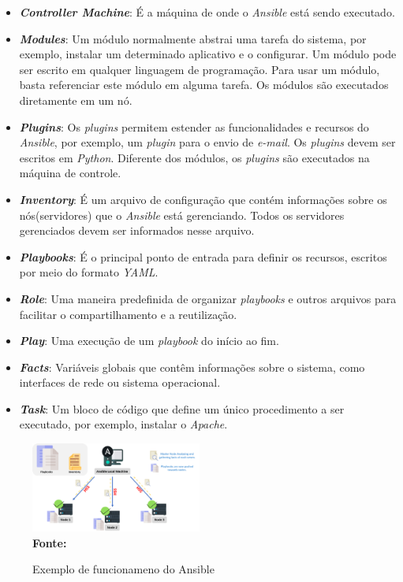 \hfill
 \begin{itemize}
\item \textbf{\textit{Controller Machine}}: É a máquina de onde o \textit{Ansible} está sendo executado. 

\item \textbf{\textit{Modules}}: Um módulo normalmente abstrai uma tarefa do sistema, por exemplo, instalar um determinado aplicativo e o configurar. Um módulo pode ser escrito em qualquer linguagem de programação. Para usar um módulo, basta referenciar este módulo em alguma tarefa. Os módulos são executados diretamente em um nó.   

\item \textbf{\textit{Plugins}}: Os \textit{plugins} permitem estender as funcionalidades e recursos do \textit{Ansible}, por exemplo, um \textit{plugin} para o envio de \textit{e-mail}. Os \textit{plugins} devem ser escritos em \textit{Python}. Diferente dos módulos, os \textit{plugins} são executados na máquina de controle.

\item \textbf{\textit{Inventory}}: É um arquivo de configuração que contém informações sobre os nós(servidores) que o \textit{Ansible} está gerenciando. Todos os servidores gerenciados devem ser informados nesse arquivo.

\item \textbf{\textit{Playbooks}}: É o principal ponto de entrada para definir os recursos, escritos por meio do formato \textit{YAML}.

\item \textbf{\textit{Role}}: Uma maneira predefinida de organizar \textit{playbooks} e outros arquivos para facilitar o compartilhamento e a reutilização.

\item \textbf{\textit{Play}}: Uma execução de um \textit{playbook} do início ao fim.

\item \textbf{\textit{Facts}}: Variáveis globais que contêm informações sobre o sistema, como interfaces de rede ou sistema operacional.

\item \textbf{\textit{Task}}: Um bloco de código que define um único procedimento a ser executado, por exemplo, instalar o \textit{Apache}.
 \end{itemize}
 \begin{figure}[ht]
	\centering	
	\caption[\hspace{0.1cm}Exemplo de funcionameno do Ansible]{Exemplo de funcionameno do Ansible}
	\vspace{-0.4cm}
	\includegraphics[width=0.5\textwidth]{figuras/ansible-working.png}
	 \vspace{-0.2cm}
	\\\textbf{\footnotesize Fonte: \cite{intellipaat}}
	\label{fig:figura6}
\end{figure}
